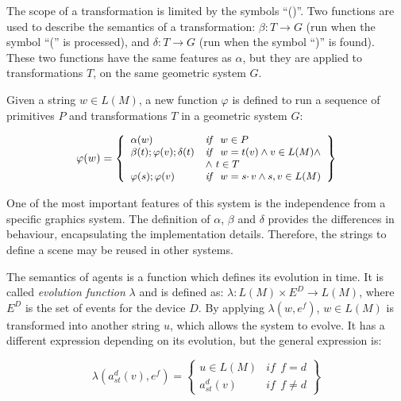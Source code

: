 \documentclass[a4paper,twoside]{article}
\begin{document}
The scope of a transformation is limited by the symbols ``()''. Two functions are used to describe
the semantics of a transformation: $\beta: T \rightarrow G$ (run when the symbol ``('' is
processed), and $\delta: T \rightarrow G$ (run when the symbol ``)'' is found). These two functions
have the same features as $\alpha$, but they are applied to transformations $T$, on the same
geometric system $G$.

Given a string $w \in L(M)$, a new function $\varphi$ is defined to run a sequence of primitives $P$
and transformations $T$ in a geometric system $G$:


\begin{equation}
\begin{small}
    \varphi (w) = \left\{
    \begin{array}{ll}
        \alpha(w) & \mathit{if} \ \ w \in P  \\

        \beta(t); \varphi(v); \delta(t) & \mathit{if} \ \ w = t(v) \wedge v \in L(M) \wedge\\
                                        & \wedge \ t \in T \\

        \varphi(s); \varphi(v)  & \mathit{if} \ \ w = s \cdotp v \wedge s, v \in L(M)
    \end{array}\right\}
\end{small}
\end{equation}



One of the most important features of this system is the independence from a specific graphics
system. The definition of $\alpha$, $\beta$ and $\delta$ provides the differences in behaviour,
encapsulating the implementation details. Therefore, the strings to define a scene may be reused in
other systems.

The semantics of agents is a function which defines its evolution in time. It is called
\textit{evolution function} $\lambda$ and is defined as: $\lambda: L(M) \times E^D \rightarrow
L(M)$, where $E^D$ is the set of events for the device $D$. By applying $\lambda(w, e^{f})$, $w \in
L(M)$ is transformed into another string $u$, which allows the system to evolve. It has a different
expression depending on its evolution, but the general expression is:

\begin{small}
\begin{equation}
    \lambda (a_{st}^{d}(v),e^{f})=
    \left\{
    \begin{array}{ll}
        u \in L(M) & \mathit{if}  \ \ f = d \\
        a_{st}^{d}(v)  & \mathit{if}  \ \ f \neq d
    \end{array}\right\}
\end{equation}
\end{small}
\end{document}
